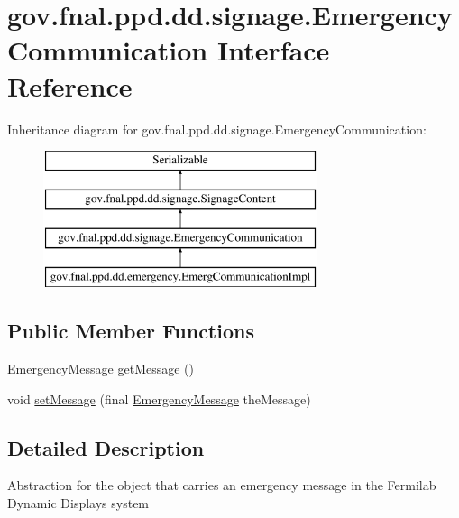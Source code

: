 \hypertarget{interfacegov_1_1fnal_1_1ppd_1_1dd_1_1signage_1_1EmergencyCommunication}{\section{gov.\-fnal.\-ppd.\-dd.\-signage.\-Emergency\-Communication Interface Reference}
\label{interfacegov_1_1fnal_1_1ppd_1_1dd_1_1signage_1_1EmergencyCommunication}
}
Inheritance diagram for gov.\-fnal.\-ppd.\-dd.\-signage.\-Emergency\-Communication\-:\begin{figure}[H]
\begin{center}
\leavevmode
\includegraphics[height=4.000000cm]{interfacegov_1_1fnal_1_1ppd_1_1dd_1_1signage_1_1EmergencyCommunication}
\end{center}
\end{figure}
\subsection*{Public Member Functions}
\begin{DoxyCompactItemize}
\item 
\hyperlink{classgov_1_1fnal_1_1ppd_1_1dd_1_1emergency_1_1EmergencyMessage}{Emergency\-Message} \hyperlink{interfacegov_1_1fnal_1_1ppd_1_1dd_1_1signage_1_1EmergencyCommunication_af923d219d82208a1ca4d947b8b726c56}{get\-Message} ()
\item 
void \hyperlink{interfacegov_1_1fnal_1_1ppd_1_1dd_1_1signage_1_1EmergencyCommunication_a11be4fd4ad5cada5a16903ba022d706b}{set\-Message} (final \hyperlink{classgov_1_1fnal_1_1ppd_1_1dd_1_1emergency_1_1EmergencyMessage}{Emergency\-Message} the\-Message)
\end{DoxyCompactItemize}


\subsection{Detailed Description}
Abstraction for the object that carries an emergency message in the Fermilab Dynamic Displays system

